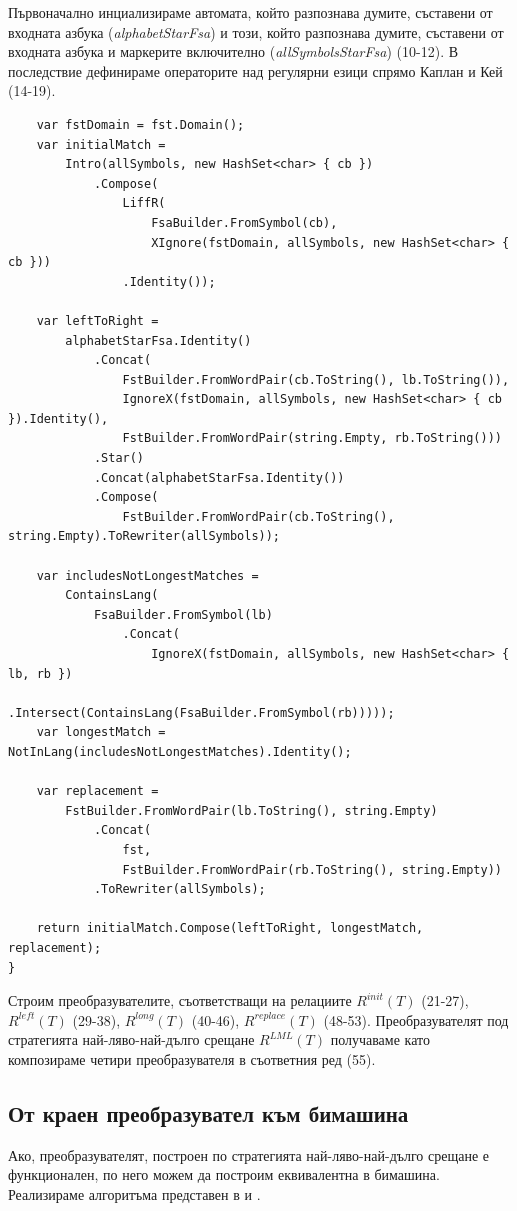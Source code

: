 \documentclass[12pt, oneside]{article}
\theoremstyle{definition}
\begin{document}
Първоначално инциализираме автомата, който разпознава думите, съставени от входната азбука (\emph{alphabetStarFsa}) и този, който разпознава думите, съставени от входната азбука и маркерите включително (\emph{allSymbolsStarFsa}) (10-12). В последствие дефинираме операторите над регулярни езици спрямо Каплан и Кей \cite{Kaplan&Kay:94} (14-19).

\begin{verbatim}
	var fstDomain = fst.Domain();
	var initialMatch =
		Intro(allSymbols, new HashSet<char> { cb })
			.Compose(
				LiffR(
					FsaBuilder.FromSymbol(cb),
					XIgnore(fstDomain, allSymbols, new HashSet<char> { cb }))
				.Identity());

	var leftToRight =
		alphabetStarFsa.Identity()
			.Concat(
				FstBuilder.FromWordPair(cb.ToString(), lb.ToString()),
				IgnoreX(fstDomain, allSymbols, new HashSet<char> { cb }).Identity(),
				FstBuilder.FromWordPair(string.Empty, rb.ToString()))
			.Star()
			.Concat(alphabetStarFsa.Identity())
			.Compose(
				FstBuilder.FromWordPair(cb.ToString(), string.Empty).ToRewriter(allSymbols));

	var includesNotLongestMatches =
		ContainsLang(
			FsaBuilder.FromSymbol(lb)
				.Concat(
					IgnoreX(fstDomain, allSymbols, new HashSet<char> { lb, rb })
						.Intersect(ContainsLang(FsaBuilder.FromSymbol(rb)))));
	var longestMatch = NotInLang(includesNotLongestMatches).Identity();

	var replacement =
		FstBuilder.FromWordPair(lb.ToString(), string.Empty)
			.Concat(
				fst,
				FstBuilder.FromWordPair(rb.ToString(), string.Empty))
			.ToRewriter(allSymbols);

	return initialMatch.Compose(leftToRight, longestMatch, replacement);
}
\end{verbatim}

Строим преобразувателите, съответстващи на релациите \( R^{init}(T) \) (21-27), \(R^{left}(T)\) (29-38), \(R^{long}(T)\) (40-46), \(R^{replace}(T) \) (48-53). Преобразувателят под стратегията най-ляво-най-дълго срещане \(R^{LML}(T)\) получаваме като композираме четири преобразувателя в съответния ред (55).

\subsection{От краен преобразувател към бимашина}

Ако, преобразувателят, построен по стратегията най-ляво-най-дълго срещане е функционален, по него можем да построим еквивалентна в бимашина. Реализираме алгоритъма представен в \cite{GerdjikovEtAl:2017} и \cite{Mihov:2018-2}.
\end{document}
